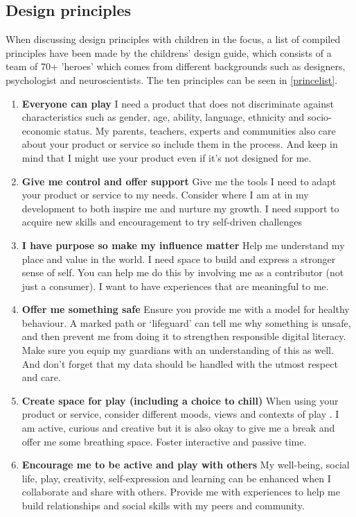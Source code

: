 \subsection{Design principles}
When discussing design principles with children in the focus, a list of compiled principles have been made by the childrens' design guide\cite{kidsDesign}, which consists of a team of 70+ 'heroes' which comes from different backgrounds such as designers, psychologist and neuroscientists. The ten principles can be seen in \autoref{princelist}.

\begin{enumerate}\label{princelist}
    \item \textbf{Everyone can play} I need a product that does not discriminate against characteristics such as gender, age, ability, language, ethnicity and socio-economic status. My parents, teachers, experts and communities also care about your product or service so include them in the process. And keep in mind that I might use your product even if it’s not designed for me.
    \item \textbf{Give me control and offer support} Give me the tools I need to adapt your product or service to my needs. Consider where I am at in my development to both inspire me and nurture my growth. I need support to acquire new skills and encouragement to try self-driven challenges
    \item \textbf{I have purpose so make my influence matter} Help me understand my place and value in the world. I need space to build and express a stronger sense of self. You can help me do this by involving me as a contributor (not just a consumer). I want to have experiences that are meaningful to me.
    \item \textbf{Offer me something safe} Ensure you provide me with a model for healthy behaviour. A marked path or ‘lifeguard’ can tell me why something is unsafe, and then prevent me from doing it to strengthen responsible digital literacy. Make sure you equip my guardians with an understanding of this as well. And don’t forget that my data should be handled with the utmost respect and care.
    \item \textbf{Create space for play (including a choice to chill)} When using your product or service, consider different moods, views and contexts of play . I am active, curious and creative but it is also okay to give me a break and offer me some breathing space. Foster interactive and passive time.
    \item \textbf{Encourage me to be active and play with others} My well-being, social life, play, creativity, self-expression and learning can be enhanced when I collaborate and share with others. Provide me with experiences to help me build relationships and social skills with my peers and community.

\end{enumerate}
